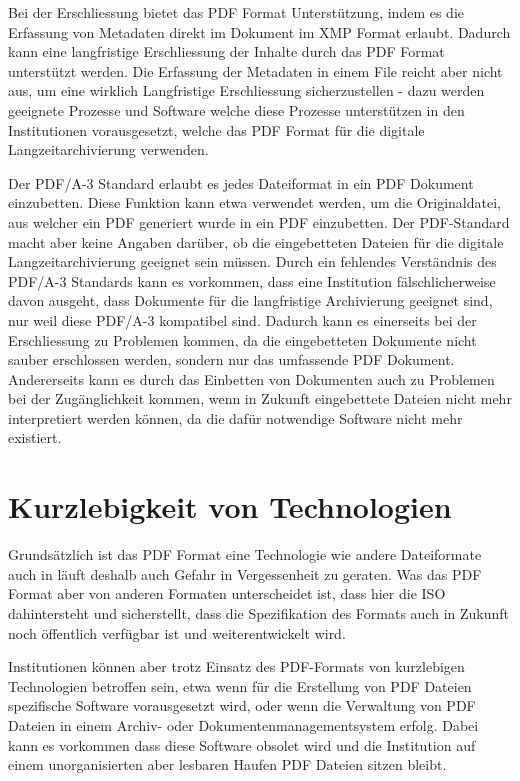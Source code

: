 \documentclass[a4paper,oneside, 12pt]{report}
\begin{document}
 Bei der Erschliessung bietet das PDF Format Unterstützung, indem es die Erfassung von Metadaten direkt im Dokument im \ac{XMP} Format erlaubt. Dadurch kann eine langfristige Erschliessung der Inhalte durch das PDF Format unterstützt werden. Die Erfassung der Metadaten in einem File reicht aber nicht aus, um eine wirklich Langfristige Erschliessung sicherzustellen - dazu werden geeignete Prozesse und Software welche diese Prozesse unterstützen in den Institutionen vorausgesetzt, welche das PDF Format für die digitale Langzeitarchivierung verwenden.

 Der PDF/A-3 Standard erlaubt es jedes Dateiformat in ein PDF Dokument einzubetten. Diese Funktion kann etwa verwendet werden, um die Originaldatei, aus welcher ein PDF generiert wurde in ein PDF einzubetten. Der PDF-Standard macht aber keine Angaben darüber, ob die eingebetteten Dateien für die digitale Langzeitarchivierung geeignet sein müssen. Durch ein fehlendes Verständnis des PDF/A-3 Standards kann es vorkommen, dass eine Institution fälschlicherweise davon ausgeht, dass Dokumente für die langfristige Archivierung geeignet sind, nur weil diese PDF/A-3 kompatibel sind. Dadurch kann es einerseits bei der Erschliessung zu Problemen kommen, da die eingebetteten Dokumente nicht sauber erschlossen werden, sondern nur das umfassende PDF Dokument. Andererseits kann es durch das Einbetten von Dokumenten auch zu Problemen bei der Zugänglichkeit kommen, wenn in Zukunft eingebettete Dateien nicht mehr interpretiert werden können, da die dafür notwendige Software nicht mehr existiert.

\section{Kurzlebigkeit von Technologien}
Grundsätzlich ist das PDF Format eine Technologie wie andere Dateiformate auch in läuft deshalb auch Gefahr in Vergessenheit zu geraten. Was das PDF Format aber von anderen Formaten unterscheidet ist, dass hier die \ac{ISO} dahintersteht und sicherstellt, dass die Spezifikation des Formats auch in Zukunft noch öffentlich verfügbar ist und weiterentwickelt wird. 

Institutionen können aber trotz Einsatz des PDF-Formats von kurzlebigen Technologien betroffen sein, etwa wenn für die Erstellung von PDF Dateien spezifische Software vorausgesetzt wird, oder wenn die Verwaltung von PDF Dateien in einem Archiv- oder Dokumentenmanagementsystem erfolg. Dabei kann es vorkommen dass diese Software obsolet wird und die Institution auf einem unorganisierten aber lesbaren Haufen PDF Dateien sitzen bleibt.
\end{document}

